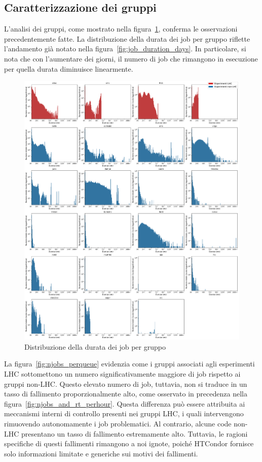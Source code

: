 \subsection{Caratterizzazione dei gruppi}

L'analisi dei gruppi, come mostrato nella
figura~\ref{fig:job_duration_perqueue}, conferma le osservazioni
precedentemente fatte. La distribuzione della durata dei job per gruppo
riflette l'andamento già notato nella figura~\ref{fig:job_duration_days}. In
particolare, si nota che con l'aumentare dei giorni, il numero di job che
rimangono in esecuzione per quella durata diminuisce linearmente.

\begin{figure}[!p]
    \centering
    \includegraphics[width=\textwidth]{images/job_duration_perqueue}
    \caption{Distribuzione della durata dei job per gruppo}
    \label{fig:job_duration_perqueue}
\end{figure}

La figura~\ref{fig:njobs_perqueue} evidenzia come i gruppi associati agli
esperimenti LHC sottomettono un numero significativamente maggiore di job
rispetto ai gruppi non-LHC. Questo elevato numero di job, tuttavia, non si
traduce in un tasso di fallimento proporzionalmente alto, come osservato in
precedenza nella figura~\ref{fig:njobs_and_rt_perhour}. Questa differenza può
essere attribuita ai meccanismi interni di controllo presenti nei gruppi LHC,
i quali intervengono rimuovendo autonomamente i job problematici. Al
contrario, alcune code non-LHC presentano un tasso di fallimento estremamente
alto. Tuttavia, le ragioni specifiche di questi fallimenti rimangono a noi
ignote, poiché HTCondor fornisce solo informazioni limitate e generiche sui
motivi dei fallimenti.

